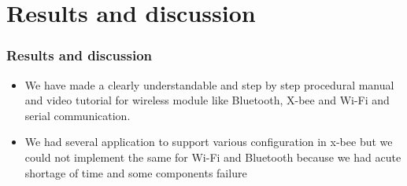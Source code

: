 \documentclass[table,10pt,blue]{beamer}	%
\begin{document}
{
\section{Results and discussion} %
\begin{frame}
	\frametitle{Results and discussion}
	\begin{itemize}
	\item  \color{blue} We have made a clearly understandable and step by step procedural manual and video tutorial for wireless module like Bluetooth, X-bee and Wi-Fi and serial communication.
	\item We had several application to support various configuration in x-bee but we could not implement the same for Wi-Fi and Bluetooth because we had acute shortage of time and some components failure \color{blue}
\end{itemize}	
\end{frame}
}
\end{document}
